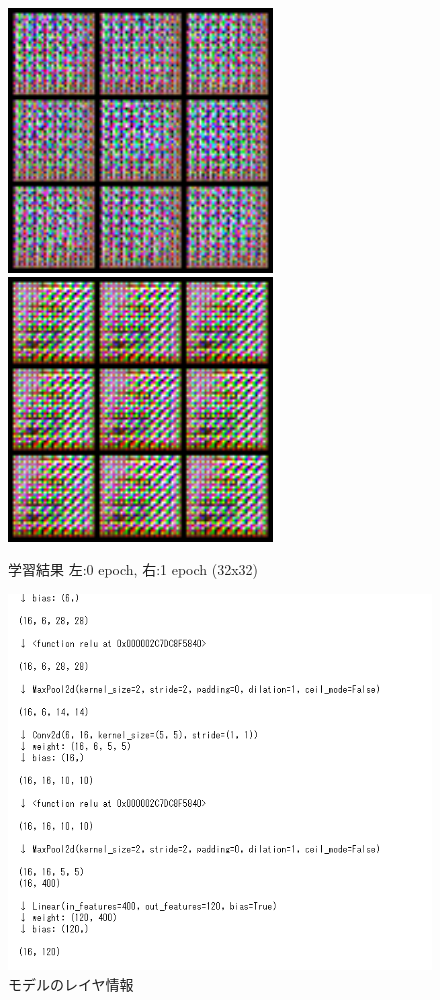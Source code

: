 \documentclass[onecolumn]{ujarticle}   %
\begin{document}
	\begin{figure}[htbp]
		\begin{center}
			\includegraphics[clip,width=7.0cm]{../../test/images/0.png}
		    \includegraphics[clip,width=7.0cm]{../../test/images/3100.png}
			\caption{学習結果 左:0 epoch, 右:1 epoch (32x32)}
			\label{fig:result}
		\end{center}
	\end{figure}

	\begin{figure}[htbp]
  	\begin{center}
	    \includegraphics[clip,width=14.0cm]{./ss.png}
	    \caption{モデルのレイヤ情報}
	    \label{fig:helper}
	  \end{center}
	\end{figure}

	
	
\end{document}
